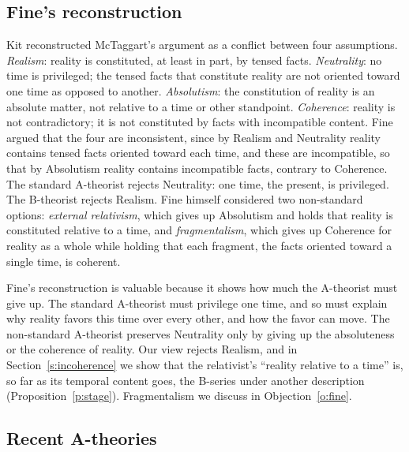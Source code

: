 \documentclass{situationist-preprint}
\begin{document}
\subsection{Fine's reconstruction}

Kit \citet{Fine2005} reconstructed McTaggart's argument as a conflict between four assumptions. \emph{Realism}: reality is constituted, at least in part, by tensed facts. \emph{Neutrality}: no time is privileged; the tensed facts that constitute reality are not oriented toward one time as opposed to another. \emph{Absolutism}: the constitution of reality is an absolute matter, not relative to a time or other standpoint. \emph{Coherence}: reality is not contradictory; it is not constituted by facts with incompatible content. Fine argued that the four are inconsistent, since by Realism and Neutrality reality contains tensed facts oriented toward each time, and these are incompatible, so that by Absolutism reality contains incompatible facts, contrary to Coherence. The standard A-theorist rejects Neutrality: one time, the present, is privileged. The B-theorist rejects Realism. Fine himself considered two non-standard options: \emph{external relativism}, which gives up Absolutism and holds that reality is constituted relative to a time, and \emph{fragmentalism}, which gives up Coherence for reality as a whole while holding that each fragment, the facts oriented toward a single time, is coherent.

Fine's reconstruction is valuable because it shows how much the A-theorist must give up. The standard A-theorist must privilege one time, and so must explain why reality favors this time over every other, and how the favor can move. The non-standard A-theorist preserves Neutrality only by giving up the absoluteness or the coherence of reality. Our view rejects Realism, and in Section~\ref{s:incoherence} we show that the relativist's \enquote{reality relative to a time} is, so far as its temporal content goes, the B-series under another description (Proposition~\ref{p:stage}). Fragmentalism we discuss in Objection~\ref{o:fine}.

\subsection{Recent A-theories}
\end{document}
